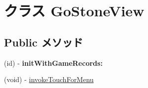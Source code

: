 \hypertarget{interface_go_stone_view}{
\section{クラス GoStoneView}
\label{interface_go_stone_view}
}
\subsection*{Public メソッド}
\begin{DoxyCompactItemize}
\item 
\hypertarget{interface_go_stone_view_a3946c2c5033f2d8056572b8d326208a4}{
(id) -\/ {\bfseries initWithGameRecords:}}
\label{interface_go_stone_view_a3946c2c5033f2d8056572b8d326208a4}

\item 
(void) -\/ \hyperlink{interface_go_stone_view_a302beee4cd600bd1547d749dee7fbfc8}{invokeTouchForMenu}
\end{DoxyCompactItemize}
